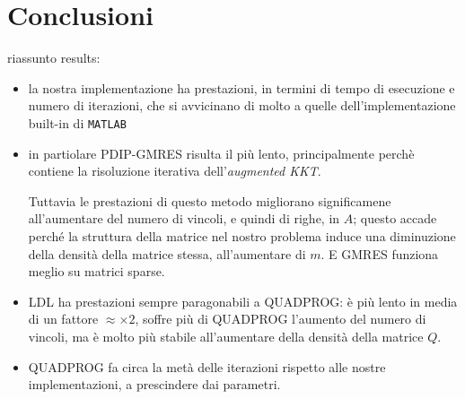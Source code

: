 \section{Conclusioni}
riassunto results:
\begin{itemize}
    \item la nostra implementazione ha prestazioni, in termini di tempo di esecuzione e numero di iterazioni, che si avvicinano di molto a quelle dell'implementazione built-in di \texttt{MATLAB}
    \item  in partiolare PDIP-GMRES risulta il più lento, principalmente perchè contiene la risoluzione iterativa dell'\textit{augmented KKT}. 
    
    Tuttavia le prestazioni di questo metodo migliorano significamene all'aumentare del numero di vincoli, e quindi di righe, in $A$; questo accade perché la struttura della matrice nel nostro problema induce una diminuzione della densità della matrice stessa, all'aumentare di $m$. E GMRES funziona meglio su matrici sparse.
    
    \item LDL ha prestazioni sempre paragonabili a QUADPROG: è più lento in media di un fattore $\approx\times2$, soffre più di QUADPROG l'aumento del numero di vincoli, ma è molto più stabile all'aumentare della densità della matrice $Q$.
    
    \item QUADPROG fa circa la metà delle iterazioni rispetto alle nostre implementazioni, a prescindere dai parametri.

\end{itemize}


